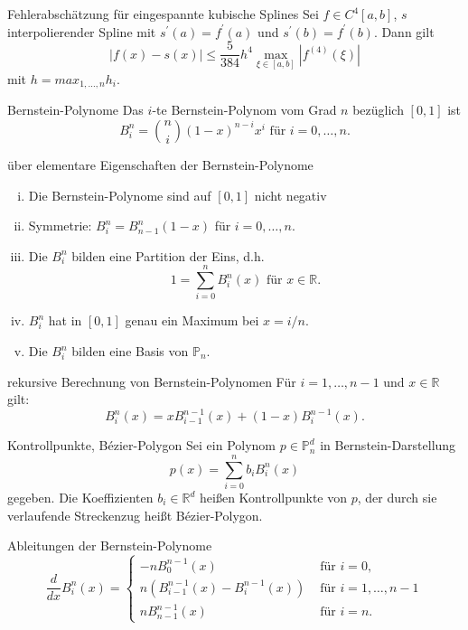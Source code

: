 \begin{flashcard}[Satz]{Fehlerabschätzung für eingespannte kubische Splines}
Sei $f \in C^4[a,b]$, $s$ interpolierender Spline mit $s^\prime(a) = f^\prime(a)$ und $s^\prime(b) = f^\prime(b)$.
Dann gilt
$$
	|f(x) - s(x)| \leq \frac{5}{384}h^4\max_{\xi \in [a,b]} |f^{(4)}(\xi)|
$$
mit $h = max_{1,\ldots ,n} h_i$.
\end{flashcard}

\begin{flashcard}[Definition]{Bernstein-Polynome}
Das $i$-te Bernstein-Polynom vom Grad $n$ bezüglich $[0,1]$ ist
$$
	B_i^n = \binom{n}{i}(1-x)^{n-i}x^i \text{ für } i=0, \ldots , n.
$$
\end{flashcard}

\begin{flashcard}[Satz]{über elementare Eigenschaften der Bernstein-Polynome}
\begin{enumerate}[(i)]
	\item Die Bernstein-Polynome sind auf $[0,1]$ nicht negativ
	\item Symmetrie: $B_i^n = B_{n-1}^n(1-x)$ für $ i=0, \ldots , n$.
	\item Die $B_i^n$ bilden eine Partition der Eins, d.h.
	$$
		1 = \sum_{i=0}^n B_i^n(x) \text{ für } x \in \mathbb{R}.
	$$
	\item $B_i^n$ hat in $[0,1]$ genau ein Maximum bei $x = i/n$.
	\item Die $B_i^n$ bilden eine Basis von $\mathbb{P}_n$.
\end{enumerate}
\end{flashcard}

\begin{flashcard}[Satz]{rekursive Berechnung von Bernstein-Polynomen}
Für $i=1, \ldots , n-1$ und $x \in \mathbb{R}$ gilt:
$$
	B_i^n(x) = xB_{i-1}^{n-1}(x) + (1-x)B_i^{n-1}(x).
$$
\end{flashcard}

\begin{flashcard}[Definition]{Kontrollpunkte, Bézier-Polygon}
Sei ein Polynom $p \in \mathbb{P}_n^d$ in Bernstein-Darstellung
$$
	p(x) = \sum_{i=0}^n b_i B_i^n(x)
$$
gegeben. Die Koeffizienten $b_i \in \mathbb{R}^d$ heißen Kontrollpunkte von $p$,
der durch sie verlaufende Streckenzug heißt Bézier-Polygon.
\end{flashcard}

\begin{flashcard}[Lemma]{Ableitungen der Bernstein-Polynome}
$$
	\frac{d}{dx}B_i^n(x) =
	\begin{cases}
		-nB_0^{n-1}(x)&\text{ für } i=0,\\
		n(B_{i-1}^{n-1}(x) - B_{i}^{n-1}(x)) &\text{ für } i=1, \ldots , n-1 \\
		nB_{n-1}^{n-1}(x) &\text{ für } i=n.
	\end{cases}
$$
\end{flashcard}

